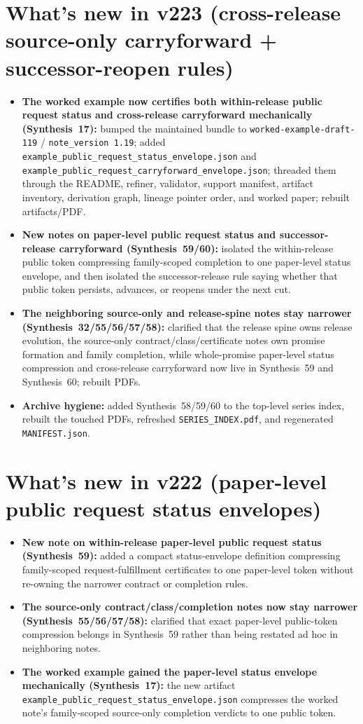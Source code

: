 \documentclass[11pt]{article}
\begin{document}
\section{What's new in v223 (cross-release source-only carryforward + successor-reopen rules)}
\begin{itemize}[leftmargin=*]
\item \textbf{The worked example now certifies both within-release public request status and cross-release carryforward mechanically (Synthesis~17):} bumped the maintained bundle to \texttt{worked-example-draft-119} / \texttt{note\_version 1.19}; added \texttt{example\_public\_request\_status\_envelope.json} and \texttt{example\_public\_request\_carryforward\_envelope.json}; threaded them through the README, refiner, validator, support manifest, artifact inventory, derivation graph, lineage pointer order, and worked paper; rebuilt artifacts/PDF.
\item \textbf{New notes on paper-level public request status and successor-release carryforward (Synthesis~59/60):} isolated the within-release public token compressing family-scoped completion to one paper-level status envelope, and then isolated the successor-release rule saying whether that public token persists, advances, or reopens under the next cut.
\item \textbf{The neighboring source-only and release-spine notes stay narrower (Synthesis~32/55/56/57/58):} clarified that the release spine owns release evolution, the source-only contract/class/certificate notes own promise formation and family completion, while whole-promise paper-level status compression and cross-release carryforward now live in Synthesis~59 and Synthesis~60; rebuilt PDFs.
\item \textbf{Archive hygiene:} added Synthesis~58/59/60 to the top-level series index, rebuilt the touched PDFs, refreshed \texttt{SERIES\_INDEX.pdf}, and regenerated \texttt{MANIFEST.json}.
\end{itemize}

\section{What's new in v222 (paper-level public request status envelopes)}
\begin{itemize}[leftmargin=*]
\item \textbf{New note on within-release paper-level public request status (Synthesis~59):} added a compact status-envelope definition compressing family-scoped request-fulfillment certificates to one paper-level token without re-owning the narrower contract or completion rules.
\item \textbf{The source-only contract/class/completion notes now stay narrower (Synthesis~55/56/57/58):} clarified that exact paper-level public-token compression belongs in Synthesis~59 rather than being restated ad hoc in neighboring notes.
\item \textbf{The worked example gained the paper-level status envelope mechanically (Synthesis~17):} the new artifact \texttt{example\_public\_request\_status\_envelope.json} compresses the worked note's family-scoped source-only completion verdicts to one public token.
\end{itemize}
\end{document}
